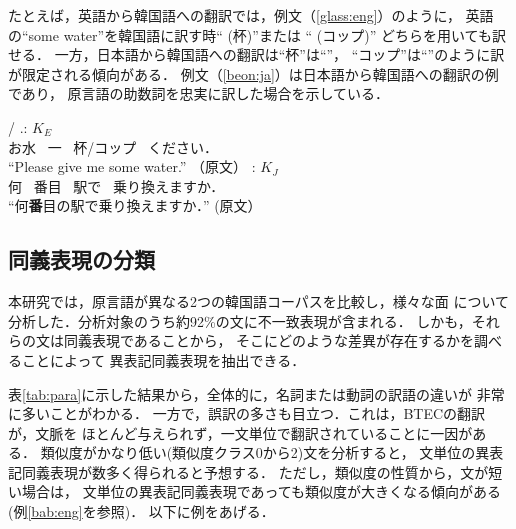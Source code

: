 たとえば，英語から韓国語への翻訳では，例文（\ref{glass:eng}）のように，
英語の``some water''を韓国語に訳す時`` (杯)''または
`` (コップ)''
どちらを用いても訳せる．
一方，日本語から韓国語への翻訳は``杯''は``''，
``コップ''は``''のように訳が限定される傾向がある．
例文（\ref{beon:ja}）は日本語から韓国語への翻訳の例であり，
原言語の助数詞を忠実に訳した場合を示している．

\begin{exe}
  \ex\label{glass:eng} \gll
{}  /  .: $K_E$\\
お水~ 一~ 杯/コップ~ ください． 　\\
  \trans ``Please give me some water.'' （原文）
\ex\label{beon:ja} \gll
{}   : $K_J$\\
何~ 番目~ 駅で~ 乗り換えますか． 　\\
     \trans ``何{\bf 番}目の駅で乗り換えますか．''  (原文）
\end{exe} 


\subsection{同義表現の分類}
\label{sec:sem-para}

本研究では，原言語が異なる2つの韓国語コーパスを比較し，様々な面
について分析した．分析対象のうち約92\%の文に不一致表現が含まれる．
しかも，それらの文は同義表現であることから，
そこにどのような差異が存在するかを調べることによって
異表記同義表現を抽出できる．

表\ref{tab:para}に示した結果から，全体的に，名詞または動詞の訳語の違いが
非常に多いことがわかる．
一方で，誤訳の多さも目立つ．これは，BTECの翻訳が，文脈を
ほとんど与えられず，一文単位で翻訳されていることに一因がある．
類似度がかなり低い(類似度クラス0から2)文を分析すると，
文単位の異表記同義表現が数多く得られると予想する．
ただし，類似度の性質から，文が短い場合は，
文単位の異表記同義表現であっても類似度が大きくなる傾向がある
(例\ref{bab:eng}を参照)．
以下に例をあげる．


